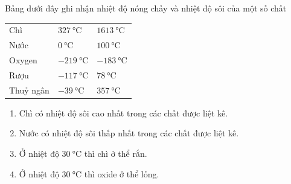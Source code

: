\begin{ex}
	Bảng dưới đây ghi nhận nhiệt độ nóng chảy và nhiệt độ sôi của một số chất
	\begin{center}
		\begin{tabular}{|C{8em}|C{10em}|C{8em}|}
			\hline
			&  &\\
			\hline
			Chì & $\SI{327}{\celsius}$ & $\SI{1613}{\celsius}$\\
			\hline
			Nước & $\SI{0}{\celsius}$ & $\SI{100}{\celsius}$\\
			\hline
			Oxygen & $\SI{-219}{\celsius}$ & $\SI{-183}{\celsius}$\\
			\hline
			Rượu & $\SI{-117}{\celsius}$ & $\SI{78}{\celsius}$\\
			\hline
			Thuỷ ngân & $\SI{-39}{\celsius}$ & $\SI{357}{\celsius}$\\
			\hline
		\end{tabular}
	\end{center}
	\begin{enumerate}[label=\alph*)]
		\item Chì có nhiệt độ sôi cao nhất trong các chất được liệt kê.
		\item Nước có nhiệt độ sôi thấp nhất trong các chất được liệt kê.
		\item Ở nhiệt độ $\SI{30}{\celsius}$ thì chì ở thể  rắn.
		\item Ở nhiệt độ $\SI{30}{\celsius}$ thì oxide ở thể lỏng.
	\end{enumerate}
\end{ex}
